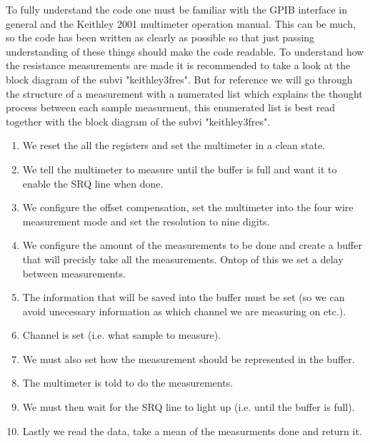 \documentclass[a4paper,12pt]{article}
\begin{document}
To fully understand the code one must be familiar with the GPIB interface in general and the Keithley 2001 multimeter operation manual. This can be much, so the code has been written as clearly as possible so that just passing understanding of these things should make the code readable. To understand how the resistance measurements are made it is recommended to take a look at the block diagram of the subvi "keithley3fres". But for reference we will go through the structure of a measurement with a numerated list which explains the thought process between each sample measurment, this enumerated list is best read together with the block diagram of the subvi "keithley3fres".

\begin{enumerate}
\item We reset the all the registers and set the multimeter in a clean state.
\item We tell the multimeter to measure until the buffer is full and want it to enable the SRQ line when done.
\item We configure the offset compensation, set the multimeter into the four wire measurement mode and set the resolution to nine digits.
\item We configure the amount of the measurements to be done and create a buffer that will precisly take all the measurements. Ontop of this we set a delay between measurements.
\item The information that will be saved into the buffer must be set (so we can avoid unecessary information as which channel we are measuring on etc.).
\item Channel is set (i.e. what sample to measure).
\item We must also set how the measurement should be represented in the buffer.
\item The multimeter is told to do the measurements.
\item We must then wait for the SRQ line to light up (i.e. until the buffer is full).
\item Lastly we read the data, take a mean of the measurments done and return it.
\end{enumerate}
\end{document}
